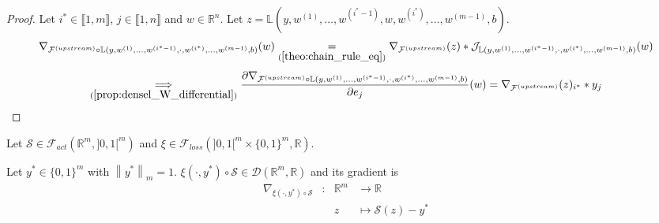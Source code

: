 \documentclass[11pt,en]{elegantpaper}
\newcommand{\norm}[1]{\left\lVert#1\right\rVert}
\newcommand{\Real}{\mathbb{R}}
\begin{document}
\begin{proof}
  Let $i^* \in \llbracket 1,m \rrbracket$, $j \in \llbracket 1,n \rrbracket$ and $w \in \Real^n$.
  Let $z = \mathbb{L}(y,w^{(1)},\ldots,w^{(i^*-1)},w,w^{(i^*)},\ldots,w^{(m-1)},b)$. \begin{equation*}
    \begin{gathered}
      \nabla_{\mathcal{F}^{(upstream)} \circ \mathbb{L}(y,w^{(1)},\ldots,w^{(i^*-1)},\cdot,w^{(i^*)},\ldots,w^{(m-1)},b)}(w)
        \underset{(\ref{theo:chain_rule_eq})}{=} \nabla_{\mathcal{F}^{(upstream)}}(z) *
        \mathcal{J}_{\mathbb{L}(y,w^{(1)},\ldots,w^{(i^*-1)},\cdot,w^{(i^*)},\ldots,w^{(m-1)},b)}(w)
    \end{gathered}
  \end{equation*}
  \begin{equation*}
    \begin{gathered}
      \underset{(\ref{prop:densel_W_differential})}{\implies}
        \frac{\partial \nabla_{\mathcal{F}^{(upstream)} \circ \mathbb{L}(y,w^{(1)},\ldots,w^{(i^*-1)},\cdot,w^{(i^*)},\ldots,w^{(m-1)},b)}}{\partial e_j} (w)
        = \nabla_{\mathcal{F}^{(upstream)}}(z)_{i^*} * y_j
    \end{gathered}
  \end{equation*}
\end{proof}

\begin{proposition}
  {\normalfont
    Let $\mathcal{S} \in \mathcal{F}_{act}(\Real^m,]0,1[^m)$ and $\xi \in \mathcal{F}_{loss}(]0,1[^m \times \{0,1\}^m, \Real)$. \par
    Let $y^* \in \{0,1\}^m$ with $\norm{y^*}_m = 1$.
    $\xi(\cdot,y^*) \circ \mathcal{S} \in \mathcal{D}(\Real^m,\Real)$ and its gradient is \begin{equation}\label{prop:cce_softmax_differential}
      \begin{array}{llll}
        \nabla_{\xi(\cdot,y^*) \circ \mathcal{S}} & : & \Real^m  & \longrightarrow \Real \\
        &   & z & \longmapsto \mathcal{S}(z) - y^*
      \end{array}
    \end{equation}
  }
\end{proposition}
\end{document}
